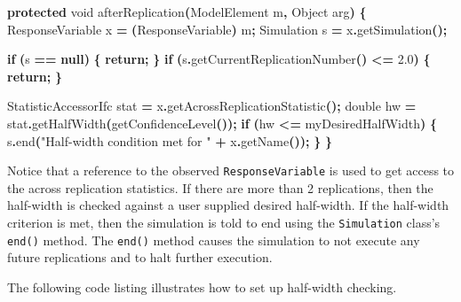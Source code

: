 \documentclass[
]{book}
\newenvironment{Shaded}{\begin{snugshade}}{\end{snugshade}}
\newcommand{\BuiltInTok}[1]{#1}
\newcommand{\ControlFlowTok}[1]{\textcolor[rgb]{0.13,0.29,0.53}{\textbf{#1}}}
\newcommand{\DataTypeTok}[1]{\textcolor[rgb]{0.13,0.29,0.53}{#1}}
\newcommand{\FloatTok}[1]{\textcolor[rgb]{0.00,0.00,0.81}{#1}}
\newcommand{\FunctionTok}[1]{\textcolor[rgb]{0.00,0.00,0.00}{#1}}
\newcommand{\KeywordTok}[1]{\textcolor[rgb]{0.13,0.29,0.53}{\textbf{#1}}}
\newcommand{\NormalTok}[1]{#1}
\newcommand{\OperatorTok}[1]{\textcolor[rgb]{0.81,0.36,0.00}{\textbf{#1}}}
\newcommand{\StringTok}[1]{\textcolor[rgb]{0.31,0.60,0.02}{#1}}
\theoremstyle{definition}
\theoremstyle{definition}
\theoremstyle{definition}
\theoremstyle{definition}
\theoremstyle{remark}
\begin{document}
\begin{Shaded}
\begin{Highlighting}[]
\KeywordTok{protected} \DataTypeTok{void} \FunctionTok{afterReplication}\OperatorTok{(}\NormalTok{ModelElement m}\OperatorTok{,} \BuiltInTok{Object}\NormalTok{ arg}\OperatorTok{)} \OperatorTok{\{}
\NormalTok{    ResponseVariable x }\OperatorTok{=} \OperatorTok{(}\NormalTok{ResponseVariable}\OperatorTok{)}\NormalTok{ m}\OperatorTok{;}
\NormalTok{    Simulation s }\OperatorTok{=}\NormalTok{ x}\OperatorTok{.}\FunctionTok{getSimulation}\OperatorTok{();}

    \ControlFlowTok{if} \OperatorTok{(}\NormalTok{s }\OperatorTok{==} \KeywordTok{null}\OperatorTok{)} \OperatorTok{\{}
        \ControlFlowTok{return}\OperatorTok{;}
    \OperatorTok{\}}
    \ControlFlowTok{if} \OperatorTok{(}\NormalTok{s}\OperatorTok{.}\FunctionTok{getCurrentReplicationNumber}\OperatorTok{()} \OperatorTok{\textless{}=} \FloatTok{2.0}\OperatorTok{)} \OperatorTok{\{}
        \ControlFlowTok{return}\OperatorTok{;}
    \OperatorTok{\}}

\NormalTok{    StatisticAccessorIfc stat }\OperatorTok{=}\NormalTok{ x}\OperatorTok{.}\FunctionTok{getAcrossReplicationStatistic}\OperatorTok{();}
    \DataTypeTok{double}\NormalTok{ hw }\OperatorTok{=}\NormalTok{ stat}\OperatorTok{.}\FunctionTok{getHalfWidth}\OperatorTok{(}\FunctionTok{getConfidenceLevel}\OperatorTok{());}
    \ControlFlowTok{if} \OperatorTok{(}\NormalTok{hw }\OperatorTok{\textless{}=}\NormalTok{ myDesiredHalfWidth}\OperatorTok{)} \OperatorTok{\{}
\NormalTok{        s}\OperatorTok{.}\FunctionTok{end}\OperatorTok{(}\StringTok{"Half{-}width condition met for "} \OperatorTok{+}\NormalTok{ x}\OperatorTok{.}\FunctionTok{getName}\OperatorTok{());}
    \OperatorTok{\}}
\OperatorTok{\}}
\end{Highlighting}
\end{Shaded}

Notice that a reference to the
observed \texttt{ResponseVariable} is used to get access to the across
replication statistics. If there are more than 2 replications, then the
half-width is checked against a user supplied desired half-width. If the
half-width criterion is met, then the simulation is told to end using
the \texttt{Simulation} class's \texttt{end()} method. The \texttt{end()} method causes the simulation to
not execute any future replications and to halt further execution.

The following code listing illustrates how to set up half-width
checking.
\end{document}
